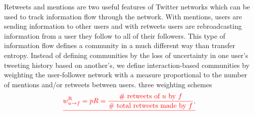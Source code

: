 Retweets and mentions are two useful features of Twitter networks which can be used to track information flow through the network.
With mentions, users are sending \DIFdelbegin {}\DIFdelend \DIFaddbegin {}\DIFaddend information to other users and with retweets users are rebroadcasting information from a user they follow to all of their followers.
This type of information flow defines a community in a much different way than transfer entropy. Instead of defining communities by the loss of uncertainty in one user's tweeting history based on another's, we define interaction-based communities by weighting the user-follower network with a measure proportional to the number of mentions and/or retweets between users. 
\DIFdelbegin {}\DIFdelend %
\DIFaddbegin {}\DIFaddend three weighting schemes\DIFdelbegin {}\begin{displaymath}\DIFdel{
w_{u \to f}^{\text{R}}=pR=\frac{\mbox{\# retweets of }u \mbox{ by }f}{\mbox{\# total retweets made by }f},
}\end{displaymath}
